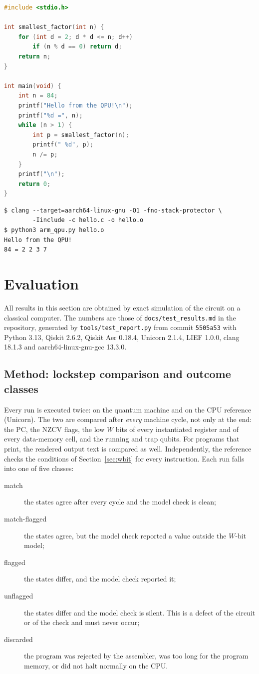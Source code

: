 \documentclass[11pt]{article}
\begin{document}
\begin{lstlisting}[language=C,caption={A C program and its run on the quantum machine.},label={lst:hello}]
#include <stdio.h>

int smallest_factor(int n) {
    for (int d = 2; d * d <= n; d++)
        if (n % d == 0) return d;
    return n;
}

int main(void) {
    int n = 84;
    printf("Hello from the QPU!\n");
    printf("%d =", n);
    while (n > 1) {
        int p = smallest_factor(n);
        printf(" %d", p);
        n /= p;
    }
    printf("\n");
    return 0;
}
\end{lstlisting}
\begin{lstlisting}[language={}]
$ clang --target=aarch64-linux-gnu -O1 -fno-stack-protector \
        -Iinclude -c hello.c -o hello.o
$ python3 arm_qpu.py hello.o
Hello from the QPU!
84 = 2 2 3 7
\end{lstlisting}

\section{Evaluation}
\label{sec:eval}

All results in this section are obtained by exact simulation of the circuit on a classical
computer. The numbers are those of \texttt{docs/test\_results.md} in the repository, generated by
\texttt{tools/test\_report.py} from commit \texttt{5505a53} with Python 3.13, Qiskit 2.6.2,
Qiskit Aer 0.18.4, Unicorn 2.1.4, LIEF 1.0.0, clang 18.1.3 and aarch64-linux-gnu-gcc 13.3.0.

\subsection{Method: lockstep comparison and outcome classes}

Every run is executed twice: on the quantum machine and on the CPU reference (Unicorn). The two
are compared after \emph{every} machine cycle, not only at the end: the PC, the NZCV flags, the
low $W$ bits of every instantiated register and of every data-memory cell, and the running and
trap qubits. For programs that print, the rendered output text is compared as well. Independently,
the reference checks the conditions of Section~\ref{sec:wbit} for every instruction. Each run falls
into one of five classes:

\begin{description}
  \item[match] the states agree after every cycle and the model check is clean;
  \item[match-flagged] the states agree, but the model check reported a value outside the $W$-bit model;
  \item[flagged] the states differ, and the model check reported it;
  \item[unflagged] the states differ and the model check is silent. This is a defect of the circuit
        or of the check and must never occur;
  \item[discarded] the program was rejected by the assembler, was too long for the program memory,
        or did not halt normally on the CPU.
\end{description}
\end{document}
